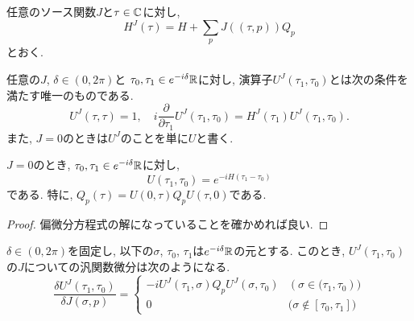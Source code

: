 \begin{dfn}
  任意のソース関数$J$と$\tau \in \mathbb{C}$に対し,
  \begin{equation}
    H^J(\tau) = H + \sum_p J((\tau,p))Q_p
  \end{equation}
  とおく.
\end{dfn}

\begin{dfn}
  任意の$J$, $\delta \in (0, 2\pi)$と
  $\tau_0, \tau_1 \in e^{-i\delta}\mathbb{R}$に対し,
  演算子$U^J(\tau_1, \tau_0)$とは次の条件を満たす唯一のものである.
  \begin{equation}
    U^J (\tau, \tau) = 1, \quad i\frac{\partial}{\partial\tau_1}U^J(\tau_1, \tau_0) =
    H^J(\tau_1)U^J(\tau_1, \tau_0).
  \end{equation}
  また, $J = 0$のときは$U^J$のことを単に$U$と書く.
\end{dfn}

\begin{thm}
  $J = 0$のとき, $\tau_0, \tau_1 \in e^{-i\delta}\mathbb{R}$に対し,
  \begin{equation}
    U(\tau_1, \tau_0) = e^{-iH(\tau_1 - \tau_0)}
  \end{equation}
  である.
  特に, $Q_p(\tau)=U(0,\tau)Q_pU(\tau,0)$である.
\end{thm}

\begin{proof}
  偏微分方程式の解になっていることを確かめれば良い.
\end{proof}

\begin{thm}
  \label{thm-functional-differentiation-UJ}
  $\delta\in (0, 2\pi)$を固定し, 以下の$\sigma$, $\tau_0$, $\tau_1$は$e^{-i\delta}\mathbb{R}$の元とする.
  このとき, $U^J(\tau_1, \tau_0)$の$J$についての汎関数微分は次のようになる.
  \begin{equation}
    \frac{\delta U^J(\tau_1, \tau_0)}{\delta J(\sigma,p)} =
    \begin{cases}
      -i U^J(\tau_1, \sigma)Q_p U^J(\sigma, \tau_0)
      & (\sigma \in \bigl(\tau_1, \tau_0)\bigr)\\
      0
      & \bigl( \sigma \notin [\tau_0, \tau_1] \bigr)
    \end{cases}
  \end{equation}
\end{thm}

